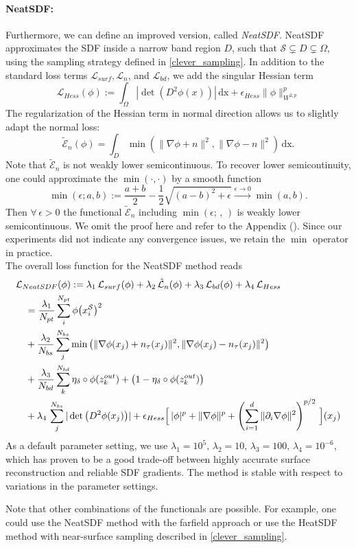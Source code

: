 \documentclass[12pt,openany]{book}
\def\S{\mathcal{S}}
\theoremstyle{plainnormal}
\theoremstyle{remark}
\begin{document}
\paragraph{NeatSDF:} Furthermore, we can define an improved version, called \emph{NeatSDF}. NeatSDF approximates the SDF inside a narrow band region $D$, such that $\S\subsetneq D\subsetneq\Omega$, using the sampling strategy defined in \cref{clever_sampling}. In addition to the standard loss terms $\mathcal{L}_{surf}, \mathcal L_{n}$, and $\mathcal{L}_{bd}$, we add the singular Hessian term 
$$ \mathcal L_{Hess}(\phi) := \int_\Omega |\det(D^2 \phi(x))| \,\mathrm{dx} + \epsilon_{Hess} \|\phi \|_{W^{2,p}}^p $$ The regularization of the Hessian term in normal direction allows us to slightly adapt the normal loss:
$$\tilde{\mathcal{E}}_{n}(\phi)= \int_D \min(\|\nabla \phi + n\|^2,\|\nabla \phi - n\|^2) \,\mathrm{dx}.$$
Note that $\tilde{\mathcal{E}}_n$ is not weakly lower semicontinuous. To recover lower semicontinuity, one could approximate the $\min(\cdot,\cdot)$ by a smooth function $$\min(\epsilon;a,b) := \frac{a + b}{2} - \frac{1}{2}\sqrt{(a-b)^2 + \epsilon} \xrightarrow[]{\epsilon \rightarrow0} \min(a,b).$$ Then $\forall\,\epsilon> 0$ the functional $\tilde {\mathcal E}_n$ including $\min(\epsilon; \,,\,)$ is weakly lower semicontinuous. We omit the proof here and refer to the Appendix (). Since our experiments did not indicate any convergence issues, we retain the $\min$ operator in practice.\\ 
The overall loss function for the NeatSDF method reads \begin{align}
    &\mathcal{L}_{NeatSDF}(\phi) := \lambda_1\, \mathcal{L}_{surf}(\phi) + \lambda _2\,\hat{\mathcal{L}}_{n}(\phi) + \lambda_3\,\mathcal{L}_{bd}(\phi) + \lambda_4\, \mathcal{L}_{Hess}\notag\\
    &\quad =\frac{\lambda_1}{N_{pt}}\sum_i^{N_{pt}}\phi\big( x_i^\S\big)^2
     \notag\\\notag & \quad + \frac{\lambda_2}{N_{bs}}\sum_j^{N_{bs}}
\min\big( \|\nabla \phi(x_j) + n_\tau(x_j)\|^2, \|\nabla \phi(x_j) - n_\tau(x_j)\|^2\big) \notag\\ & \quad+ \frac{\lambda_3}{N_{bd}} \sum_k^{N_{bd}} \eta_\delta\circ\phi(z_k^{out}) +\big(1-\eta_\delta\circ\phi(z_k^{out})\big)\notag\\
&\quad +\lambda_4\, \sum_j^{N_{bs}}|\det\big( D^2 \phi(x_j)\big)| + \epsilon_{Hess}\Big[\,|\phi|^p + \|\nabla \phi\|^p + \left( \sum_{i=1}^d \| \partial_i \nabla \phi \|^2 \right)^{p/2} \,\Big](x_j) 
\end{align} 
As a default parameter setting, we use $\lambda_ 1 = 10^5, \,\lambda_2 = 10, \,\lambda_3 = 100, \,\lambda_4 = 10^{-6}$, which has proven to be a good trade-off between highly accurate surface reconstruction and reliable SDF gradients. The method is stable with respect to variations in the parameter settings.\par
Note that other combinations of the functionals are possible. For example, one could use the NeatSDF method with the farfield approach or use the HeatSDF method with near-surface sampling described in \cref{clever_sampling}. 
\end{document}
